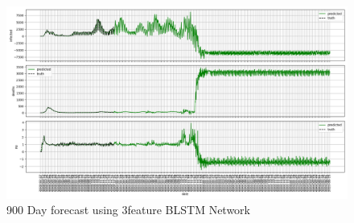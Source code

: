 \documentclass[anon]{CI}
\begin{document}
 \begin{figure}[!ht]
     \center
     \includegraphics[width=\linewidth]{blstm3feats-900extension}
     \caption{\label{fig:900daypred}900 Day forecast using 3feature BLSTM Network}
 \end{figure}
\end{document}
